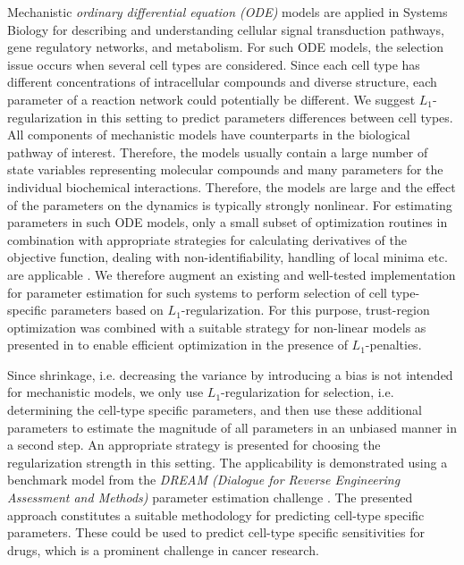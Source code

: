 \documentclass{bioinfo}
\begin{document}
Mechanistic  \emph{ordinary differential equation (ODE)} models are applied in Systems Biology for describing and understanding cellular signal transduction pathways, gene regulatory networks, and metabolism.
For such ODE models, the selection issue occurs when several cell types are considered. 
Since each cell type has different concentrations of intracellular compounds and diverse structure, each parameter of a reaction network could potentially be different. 
We suggest $L_1$-regularization in this setting to predict parameters differences between cell types.
All components of mechanistic models have counterparts in the biological pathway of interest. 
Therefore, the models usually contain a large number of state variables representing molecular compounds and many parameters for the individual biochemical interactions. 
Therefore, the models are large and the effect of the parameters on the dynamics is typically strongly nonlinear. 
For estimating parameters in such ODE models, only a small subset of optimization routines in combination with appropriate strategies for calculating derivatives of the objective function, dealing with non-identifiability, handling of local minima etc. are applicable \citep{Raue2013}. 
We therefore augment an existing and well-tested implementation for parameter estimation for such systems \citep{Raue2015} to perform selection of cell type-specific parameters based on $L_1$-regularization. 
For this purpose, trust-region optimization \citep{Coleman96} was combined with a suitable strategy for non-linear models as presented in \citep{Schmidt09} to enable efficient optimization in the presence of $L_1$-penalties.

Since shrinkage, i.e. decreasing the variance by introducing a bias is not intended for mechanistic models, we only use $L_1$-regularization for selection, i.e. determining the cell-type specific parameters, and then use these additional parameters to estimate the magnitude of all parameters in an unbiased manner in a second step. 
An appropriate strategy is presented for choosing the regularization strength in this setting. 
The applicability is demonstrated using a benchmark model from the \emph{DREAM (Dialogue for Reverse Engineering Assessment and Methods)} parameter estimation challenge \citep{Meyer2014}. 
The presented approach constitutes a suitable methodology for predicting cell-type specific parameters.
These could be used to predict cell-type specific sensitivities for drugs, which is a prominent challenge in cancer research.
\end{document}
